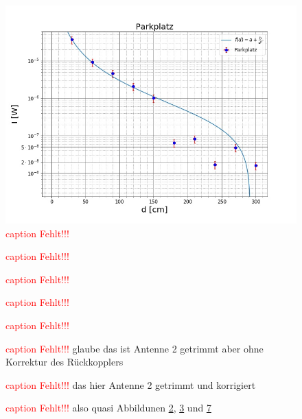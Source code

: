 \documentclass[titlepage,11pt,a4paper,ngerman]{article}
\begin{document}
\begin{figure}[ht]
	\includegraphics[scale=0.55]{Bilder/Abstand-Parkplatz.jpg}
	\centering
	\caption{\textcolor{red}{caption Fehlt!!!}}
	\label{Parkplatz-A}
\end{figure}

\begin{figure}[ht]
	\centering
	\caption{\textcolor{red}{caption Fehlt!!!}}
	\label{Ant1}
\end{figure}

\begin{figure}[ht]
	\centering
	\caption{\textcolor{red}{caption Fehlt!!!}}
	\label{Ant2}
\end{figure}

\begin{figure}[ht]
	\centering
	\caption{\textcolor{red}{caption Fehlt!!!}}
	\label{Ant1alt}
\end{figure}

\begin{figure}[ht]
	\centering
	\caption{\textcolor{red}{caption Fehlt!!!}}
	\label{Ant2alt}
\end{figure}

\begin{figure}[ht]
	\centering
	\caption{\textcolor{red}{caption Fehlt!!!} glaube das ist Antenne 2 getrimmt aber ohne Korrektur des Rückkopplers}
	\label{Ant2-mitrückkoppler}
\end{figure}

\begin{figure}[ht]
	\centering
	\caption{\textcolor{red}{caption Fehlt!!!} das hier Antenne 2 getrimmt und korrigiert}
	\label{Ant2-getrimmt}
\end{figure}

\begin{figure}[ht]
	\centering
	\caption{\textcolor{red}{caption Fehlt!!!} also quasi Abbildunen \ref{Ant1}, \ref{Ant2} und \ref{Ant2-getrimmt}}
	\label{Vergleich}
\end{figure}
\end{document}
